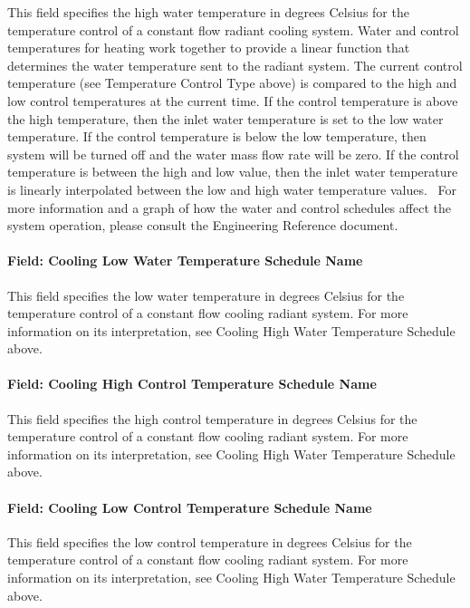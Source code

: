 This field specifies the high water temperature in degrees Celsius for the temperature control of a constant flow radiant cooling system. Water and control temperatures for heating work together to provide a linear function that determines the water temperature sent to the radiant system. The current control temperature (see Temperature Control Type above) is compared to the high and low control temperatures at the current time. If the control temperature is above the high temperature, then the inlet water temperature is set to the low water temperature. If the control temperature is below the low temperature, then system will be turned off and the water mass flow rate will be zero. If the control temperature is between the high and low value, then the inlet water temperature is linearly interpolated between the low and high water temperature values.~ For more information and a graph of how the water and control schedules affect the system operation, please consult the Engineering Reference document.

\paragraph{Field: Cooling Low Water Temperature Schedule Name}\label{field-cooling-low-water-temperature-schedule-name}

This field specifies the low water temperature in degrees Celsius for the temperature control of a constant flow cooling radiant system. For more information on its interpretation, see Cooling High Water Temperature Schedule above.

\paragraph{Field: Cooling High Control Temperature Schedule Name}\label{field-cooling-high-control-temperature-schedule-name}

This field specifies the high control temperature in degrees Celsius for the temperature control of a constant flow cooling radiant system. For more information on its interpretation, see Cooling High Water Temperature Schedule above.

\paragraph{Field: Cooling Low Control Temperature Schedule Name}\label{field-cooling-low-control-temperature-schedule-name}

This field specifies the low control temperature in degrees Celsius for the temperature control of a constant flow cooling radiant system. For more information on its interpretation, see Cooling High Water Temperature Schedule above.

